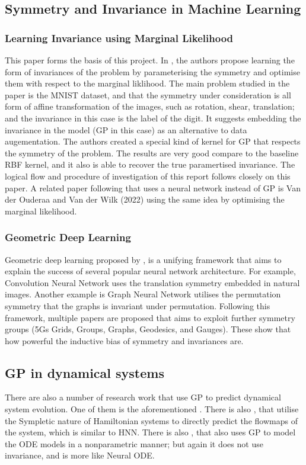\documentclass{statsmsc}
\begin{document}
\subsection{Symmetry and Invariance in Machine Learning}

\subsubsection{Learning Invariance using Marginal Likelihood}
This paper forms the basis of this project.
In \cite{Mark2017}, the authors propose learning the form of invariances of the problem by parameterising the symmetry and optimise them with respect to the marginal liklihood.
The main problem studied in the paper is the MNIST dataset, and that the symmetry under consideration is all form of affine transformation of the images, such as rotation, shear, translation; and the invariance in this case is the label of the digit. 
It suggests embedding the invariance in the model (GP in this case) as an alternative to data augementation.
The authors created a special kind of kernel for GP that respects the symmetry of the problem.
The results are very good compare to the baseline RBF kernel, and it also is able to recover the true paramertised invariance. 
The logical flow and procedure of investigation of this report follows closely on this paper. 
A related paper following that uses a neural network instead of GP is Van der Ouderaa and Van der Wilk (2022) using the same idea by optimising the marginal likelihood.

\subsubsection{Geometric Deep Learning}
Geometric deep learning proposed by \cite{Bronstein2017}, is a unifying framework that aims to explain the success of several popular neural network architecture. 
For example, Convolution Neural Network uses the translation symmetry embedded in natural images. 
Another example is Graph Neural Network utilises the permutation symmetry that the graphs is invariant under permutation.
Following this framework, multiple papers are proposed that aims to exploit further symmetry groups (5Gs Grids, Groups, Graphs, Geodesics, and Gauges).
These show that how powerful the inductive bias of symmetry and invariances are.

\subsection{GP in dynamical systems}
There are also a number of research work that use GP to predict dynamical system evolution.
One of them is the aforementioned \cite{Raissi2018}.
There is also \cite{Rath2020}, that utilise the Sympletic nature of Hamiltonian systems to directly predict the flowmaps of the system, which is similar to HNN.
There is also \cite{Heinonen2018}, that also uses GP to model the ODE models in a nonparametric manner; but again it does not use invariance, and is more like Neural ODE. 
\end{document}
